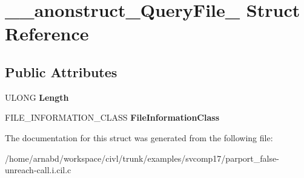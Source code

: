 \hypertarget{struct____anonstruct__QueryFile__59}{}\section{\+\_\+\+\_\+anonstruct\+\_\+\+Query\+File\+\_ Struct Reference}
\label{struct____anonstruct__QueryFile__59}
\subsection*{Public Attributes}
\begin{DoxyCompactItemize}
\item 
\hypertarget{struct____anonstruct__QueryFile__59_ade5d7cc56144d362e8afe5be43348df7}{}U\+L\+O\+N\+G {\bfseries Length}\label{struct____anonstruct__QueryFile__59_ade5d7cc56144d362e8afe5be43348df7}

\item 
\hypertarget{struct____anonstruct__QueryFile__59_a76f4ada778ccbb85136651e495bb9520}{}F\+I\+L\+E\+\_\+\+I\+N\+F\+O\+R\+M\+A\+T\+I\+O\+N\+\_\+\+C\+L\+A\+S\+S {\bfseries File\+Information\+Class}\label{struct____anonstruct__QueryFile__59_a76f4ada778ccbb85136651e495bb9520}

\end{DoxyCompactItemize}


The documentation for this struct was generated from the following file\+:\begin{DoxyCompactItemize}
\item 
/home/arnabd/workspace/civl/trunk/examples/svcomp17/parport\+\_\+false-\/unreach-\/call.\+i.\+cil.\+c\end{DoxyCompactItemize}
